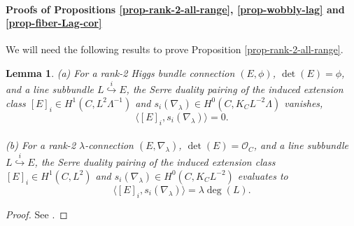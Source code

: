 \documentclass[twoside, 11pt]{article}
\numberwithin{equation}{section}
\theoremstyle{theorem}
\numberwithin{theorem}{section}
\newtheorem{lemma}[lemma]{Lemma}
\theoremstyle{definition}
\begin{document}
\paragraph{Proofs of Propositions \ref{prop-rank-2-all-range},  \ref{prop-wobbly-lag} and \ref{prop-fiber-Lag-cor}}
We will need the following results to prove Proposition \ref{prop-rank-2-all-range}.
\begin{lemma}\label{lem-Serre-pairing}
(a) For a rank-2 Higgs bundle connection $(E, \phi)$, $\det(E) = \phi$, and a line subbundle $L \overset{i}{\hookrightarrow} E$, the Serre duality pairing of the induced extension class $[E]_i \in H^1(C, L^2 \Lambda^{-1})$ and $s_i(\nabla_\lambda) \in H^0(C, K_C L^{-2} \Lambda)$ vanishes,
\begin{equation}
    \big\langle [E]_i, s_i(\nabla_\lambda) \big\rangle = 0.
\end{equation}
\\
(b) For a rank-2 $\lambda$-connection $(E, \nabla_\lambda)$, $\det(E) = \mathcal{O}_C$, and a line subbundle $L \overset{i}{\hookrightarrow} E$, the Serre duality pairing of the induced extension class $[E]_i \in H^1(C, L^2)$ and $s_i(\nabla_\lambda) \in H^0(C, K_C L^{-2})$ evaluates to 
\begin{equation}
    \big\langle [E]_i, s_i(\nabla_\lambda) \big\rangle = \lambda \deg(L).
\end{equation}
\end{lemma}
\begin{proof}
    See \cite{DT23, D24-lambda}. 
\end{proof}
\end{document}
